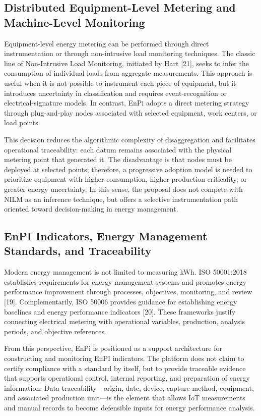 \documentclass{ieeeaccess}
\begin{document}
\subsection{Distributed Equipment-Level Metering and Machine-Level Monitoring}
\label{subsec:machine-level-monitoring}

Equipment-level energy metering can be performed through direct instrumentation or through non-intrusive load monitoring techniques. The classic line of Non-Intrusive Load Monitoring, initiated by Hart [21], seeks to infer the consumption of individual loads from aggregate measurements. This approach is useful when it is not possible to instrument each piece of equipment, but it introduces uncertainty in classification and requires event-recognition or electrical-signature models. In contrast, EnPi adopts a direct metering strategy through plug-and-play nodes associated with selected equipment, work centers, or load points.

This decision reduces the algorithmic complexity of disaggregation and facilitates operational traceability: each datum remains associated with the physical metering point that generated it. The disadvantage is that nodes must be deployed at selected points; therefore, a progressive adoption model is needed to prioritize equipment with higher consumption, higher production criticality, or greater energy uncertainty. In this sense, the proposal does not compete with NILM as an inference technique, but offers a selective instrumentation path oriented toward decision-making in energy management.

\subsection{EnPI Indicators, Energy Management Standards, and Traceability}
\label{subsec:enpi-standards}

Modern energy management is not limited to measuring kWh. ISO 50001:2018 establishes requirements for energy management systems and promotes energy performance improvement through processes, objectives, monitoring, and review [19]. Complementarily, ISO 50006 provides guidance for establishing energy baselines and energy performance indicators [20]. These frameworks justify connecting electrical metering with operational variables, production, analysis periods, and objective references.

From this perspective, EnPi is positioned as a support architecture for constructing and monitoring EnPI indicators. The platform does not claim to certify compliance with a standard by itself, but to provide traceable evidence that supports operational control, internal reporting, and preparation of energy information. Data traceability---origin, date, device, capture method, equipment, and associated production unit---is the element that allows IoT measurements and manual records to become defensible inputs for energy performance analysis.
\end{document}
